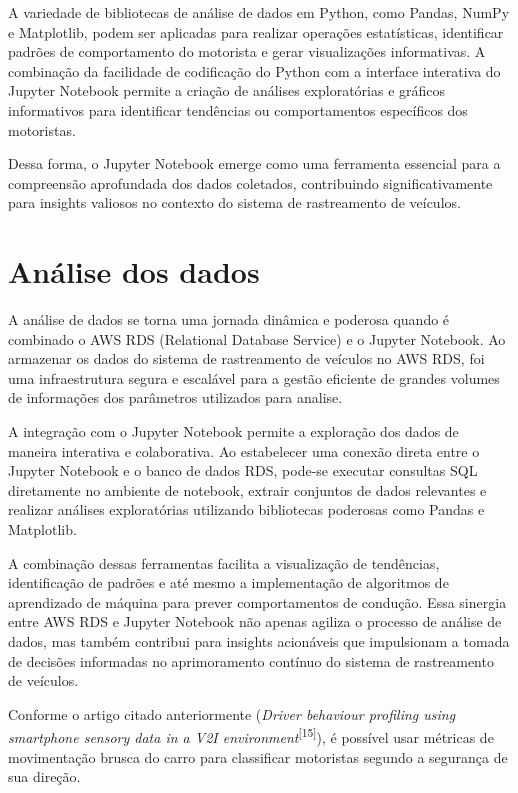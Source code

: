 A variedade de bibliotecas de análise de dados em Python, como Pandas, NumPy e Matplotlib, podem ser aplicadas para realizar operações estatísticas, identificar padrões de comportamento do motorista e gerar visualizações informativas. A combinação da facilidade de codificação do Python com a interface interativa do Jupyter Notebook permite a criação de análises exploratórias e gráficos informativos  para identificar tendências ou comportamentos específicos dos motoristas.

Dessa forma, o Jupyter Notebook emerge como uma ferramenta essencial para a compreensão aprofundada dos dados coletados, contribuindo significativamente para insights valiosos no contexto do sistema de rastreamento de veículos.

\section{Análise dos dados}
A análise de dados se torna uma jornada dinâmica e poderosa quando é combinado o AWS RDS (Relational Database Service) e o Jupyter Notebook. Ao armazenar os dados do sistema de rastreamento de veículos no AWS RDS, foi uma infraestrutura segura e escalável para a gestão eficiente de grandes volumes de informações dos parâmetros utilizados para analise. 

A integração com o Jupyter Notebook permite a exploração dos dados de maneira interativa e colaborativa. Ao estabelecer uma conexão direta entre o Jupyter Notebook e o banco de dados RDS, pode-se executar consultas SQL diretamente no ambiente de notebook, extrair conjuntos de dados relevantes e realizar análises exploratórias utilizando bibliotecas poderosas como Pandas e Matplotlib. 

A combinação dessas ferramentas facilita a visualização de tendências, identificação de padrões e até mesmo a implementação de algoritmos de aprendizado de máquina para prever comportamentos de condução. Essa sinergia entre AWS RDS e Jupyter Notebook não apenas agiliza o processo de análise de dados, mas também contribui para insights acionáveis que impulsionam a tomada de decisões informadas no aprimoramento contínuo do sistema de rastreamento de veículos.

Conforme o artigo citado anteriormente (\textit{Driver behaviour profiling using smartphone sensory data in a V2I environment}\textsuperscript{[15]}), é possível usar métricas de movimentação brusca do carro para classificar motoristas segundo a segurança de sua direção.

